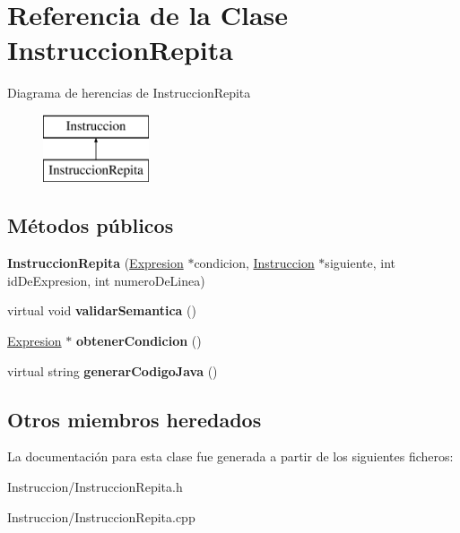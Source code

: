 \hypertarget{class_instruccion_repita}{\section{Referencia de la Clase Instruccion\-Repita}
\label{class_instruccion_repita}
}
Diagrama de herencias de Instruccion\-Repita\begin{figure}[H]
\begin{center}
\leavevmode
\includegraphics[height=2.000000cm]{class_instruccion_repita}
\end{center}
\end{figure}
\subsection*{Métodos públicos}
\begin{DoxyCompactItemize}
\item 
\hypertarget{class_instruccion_repita_a754302f91716408b5ee445442cf26549}{{\bfseries Instruccion\-Repita} (\hyperlink{class_expresion}{Expresion} $\ast$condicion, \hyperlink{class_instruccion}{Instruccion} $\ast$siguiente, int id\-De\-Expresion, int numero\-De\-Linea)}\label{class_instruccion_repita_a754302f91716408b5ee445442cf26549}

\item 
\hypertarget{class_instruccion_repita_ae1b3075c328d3fef683d75a54dfe5b17}{virtual void {\bfseries validar\-Semantica} ()}\label{class_instruccion_repita_ae1b3075c328d3fef683d75a54dfe5b17}

\item 
\hypertarget{class_instruccion_repita_a6d23140f918de6995d69e7d5a3b911f4}{\hyperlink{class_expresion}{Expresion} $\ast$ {\bfseries obtener\-Condicion} ()}\label{class_instruccion_repita_a6d23140f918de6995d69e7d5a3b911f4}

\item 
\hypertarget{class_instruccion_repita_a350f2db05e5af509869a5012cb0eab2c}{virtual string {\bfseries generar\-Codigo\-Java} ()}\label{class_instruccion_repita_a350f2db05e5af509869a5012cb0eab2c}

\end{DoxyCompactItemize}
\subsection*{Otros miembros heredados}


La documentación para esta clase fue generada a partir de los siguientes ficheros\-:\begin{DoxyCompactItemize}
\item 
Instruccion/Instruccion\-Repita.\-h\item 
Instruccion/Instruccion\-Repita.\-cpp\end{DoxyCompactItemize}
